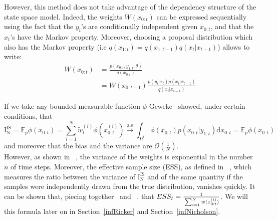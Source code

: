 \documentclass[12pt]{article}
\begin{document}
	However, this method does not take advantage of the dependency structure of the state space model. Indeed, the weights $W(x_{0:t})$ can be expressed sequentially using the fact that the $y_t$'s are conditionally independent given $x_{0:t}$, and that the $x_t$'s have the Markov property. Moreover, choosing a proposal distribution which also has the Markov property (i.e $q(x_{1:t})=q(x_{1:t-1})q(x_t| x_{t-1})$) allows to write:
	\begin{align}
	W(x_{0:t}) & = \frac{p(x_{0:t},y_{1:t}, \theta)}{q(x_{0:t})} \\
	& = W(x_{0:t-1})\frac{p(y_t|x_t)p(x_t|x_{t-1})}{q(x_t|x_{t-1})}
	\end{align}
	
	If we take any bounded measurable function $\phi$ Geweke~\cite{Geweke1989} showed, under certain conditions, that
	\begin{equation*}
	 \mathrm{I_N^{IS}}=\mathbb{E}_{\hat{p}}\phi(x_{0:t}) = \sum_{i=1}^{N} \tilde{w}_t^{(i)} \phi(x_{0:t}^{(i)}) \xrightarrow{\mathrm{a.s}} \int_{\Omega^t} \phi({x_{0:t}})p(x_{0:t}|y_{1:t})\mathrm{d}x_{0:t}=\mathbb{E}_{p}\phi(x_{0:t})
	\end{equation*}
	and moreover that the bias and the variance are $\mathcal{O}(\frac{1}{N})$.\\
	
	However, as shown in ~\cite{kong1994sequential}, the variance of the weights is exponential in the number $n$ of time steps. Moreover, the effective sample size (ESS), as defined in ~\cite{liu2008monte}, which measures the ratio between the variance of $\mathrm{I_N^{IS}}$ and of the same quantity if the samples were independently drawn from the true distribution, vanishes quickly.  It can be shown that, piecing together~\cite[][pp.~35-36]{liu2008monte} and ~\cite[][pp.~98-100]{robert2009introducing}, that  $ESS_t = \frac{1}{\strut \sum_{i=1}^{N} w(x_{0:t}^{(i)})}$. We will this formula later on in Section~\ref{infRicker} and Section~\ref{infNicholson}.
	
\end{document}
